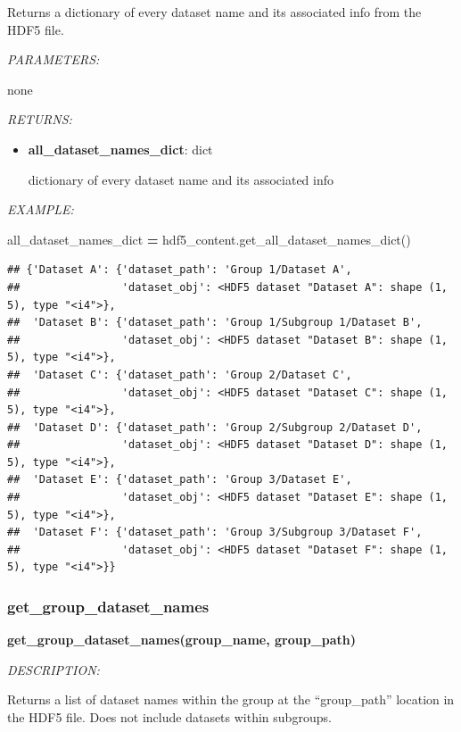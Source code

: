 \documentclass[
]{article}
\newenvironment{Shaded}{\begin{snugshade}}{\end{snugshade}}
\newcommand{\NormalTok}[1]{#1}
\newcommand{\OperatorTok}[1]{\textcolor[rgb]{0.81,0.36,0.00}{\textbf{#1}}}
\begin{document}
Returns a dictionary of every dataset name and its associated info from the HDF5 file.

\emph{PARAMETERS:}

none

\emph{RETURNS:}

\begin{itemize}
\item
  \textbf{all\_dataset\_names\_dict}: dict

  dictionary of every dataset name and its associated info
\end{itemize}

\emph{EXAMPLE:}

\begin{Shaded}
\begin{Highlighting}[]
\NormalTok{all_dataset_names_dict }\OperatorTok{=}\NormalTok{ hdf5_content.get_all_dataset_names_dict()}
\end{Highlighting}
\end{Shaded}

\begin{verbatim}
## {'Dataset A': {'dataset_path': 'Group 1/Dataset A',
##                'dataset_obj': <HDF5 dataset "Dataset A": shape (1, 5), type "<i4">},
##  'Dataset B': {'dataset_path': 'Group 1/Subgroup 1/Dataset B',
##                'dataset_obj': <HDF5 dataset "Dataset B": shape (1, 5), type "<i4">},
##  'Dataset C': {'dataset_path': 'Group 2/Dataset C',
##                'dataset_obj': <HDF5 dataset "Dataset C": shape (1, 5), type "<i4">},
##  'Dataset D': {'dataset_path': 'Group 2/Subgroup 2/Dataset D',
##                'dataset_obj': <HDF5 dataset "Dataset D": shape (1, 5), type "<i4">},
##  'Dataset E': {'dataset_path': 'Group 3/Dataset E',
##                'dataset_obj': <HDF5 dataset "Dataset E": shape (1, 5), type "<i4">},
##  'Dataset F': {'dataset_path': 'Group 3/Subgroup 3/Dataset F',
##                'dataset_obj': <HDF5 dataset "Dataset F": shape (1, 5), type "<i4">}}
\end{verbatim}

\hypertarget{get_group_dataset_names}{%
\subsubsection{get\_group\_dataset\_names}\label{get_group_dataset_names}}

\textbf{get\_group\_dataset\_names(group\_name, group\_path)}

\emph{DESCRIPTION:}

Returns a list of dataset names within the group at the ``group\_path'' location in the HDF5 file. Does not include datasets within subgroups.
\end{document}
